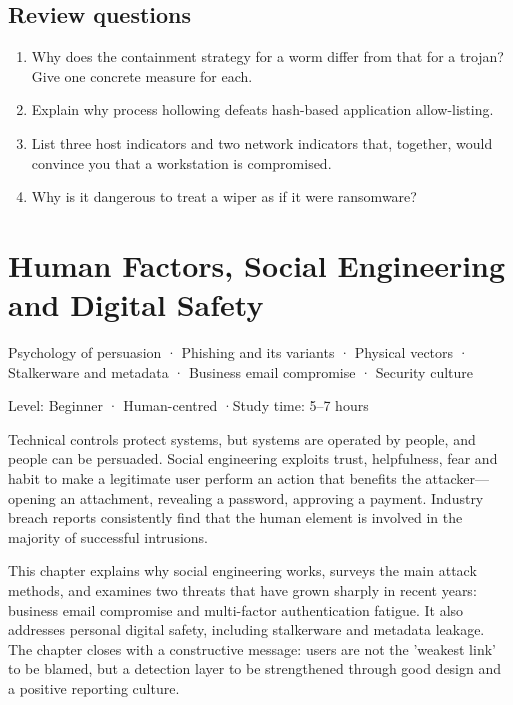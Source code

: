 \documentclass[11pt,openany]{book}
\newcommand{\chaptermeta}[3]{%
  {\sffamily\small\color{accent}#1\par}\vspace{0.3em}
  {\sffamily\footnotesize\color{gray}#2 \quad·\quad #3\par}\vspace{1.2em}}
\begin{document}
\section*{Review questions}
\begin{enumerate}
  \item Why does the containment strategy for a worm differ from that for a trojan? Give one concrete measure for each.
  \item Explain why process hollowing defeats hash-based application allow-listing.
  \item List three host indicators and two network indicators that, together, would convince you that a workstation is compromised.
  \item Why is it dangerous to treat a wiper as if it were ransomware?
\end{enumerate}

\chapter{Human Factors, Social Engineering and Digital Safety}\label{ch:5}
\chaptermeta{Psychology of persuasion · Phishing and its variants · Physical vectors · Stalkerware and metadata · Business email compromise · Security culture}{Level: Beginner · Human-centred}{Study time: 5–7 hours}

Technical controls protect systems, but systems are operated by people, and people can be persuaded. Social engineering exploits trust, helpfulness, fear and habit to make a legitimate user perform an action that benefits the attacker—opening an attachment, revealing a password, approving a payment. Industry breach reports consistently find that the human element is involved in the majority of successful intrusions.

This chapter explains why social engineering works, surveys the main attack methods, and examines two threats that have grown sharply in recent years: business email compromise and multi-factor authentication fatigue. It also addresses personal digital safety, including stalkerware and metadata leakage. The chapter closes with a constructive message: users are not the 'weakest link' to be blamed, but a detection layer to be strengthened through good design and a positive reporting culture.
\end{document}
